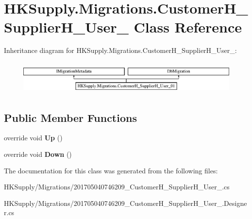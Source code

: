 \hypertarget{class_h_k_supply_1_1_migrations_1_1_customer_h___supplier_h___user__01}{}\section{H\+K\+Supply.\+Migrations.\+Customer\+H\+\_\+\+Supplier\+H\+\_\+\+User\+\_ Class Reference}
\label{class_h_k_supply_1_1_migrations_1_1_customer_h___supplier_h___user__01}
Inheritance diagram for H\+K\+Supply.\+Migrations.\+Customer\+H\+\_\+\+Supplier\+H\+\_\+\+User\+\_\+:\begin{figure}[H]
\begin{center}
\leavevmode
\includegraphics[height=1.739130cm]{class_h_k_supply_1_1_migrations_1_1_customer_h___supplier_h___user__01}
\end{center}
\end{figure}
\subsection*{Public Member Functions}
\begin{DoxyCompactItemize}
\item 
\mbox{\label{class_h_k_supply_1_1_migrations_1_1_customer_h___supplier_h___user__01_a084f3a40be168a22e3d241b9a87149d1}} 
override void {\bfseries Up} ()
\item 
\mbox{\label{class_h_k_supply_1_1_migrations_1_1_customer_h___supplier_h___user__01_a333d397dd7fc1f7a89b1a8da159e41c1}} 
override void {\bfseries Down} ()
\end{DoxyCompactItemize}


The documentation for this class was generated from the following files\+:\begin{DoxyCompactItemize}
\item 
H\+K\+Supply/\+Migrations/201705040746209\+\_\+\+Customer\+H\+\_\+\+Supplier\+H\+\_\+\+User\+\_.\+cs\item 
H\+K\+Supply/\+Migrations/201705040746209\+\_\+\+Customer\+H\+\_\+\+Supplier\+H\+\_\+\+User\+\_.\+Designer.\+cs\end{DoxyCompactItemize}
